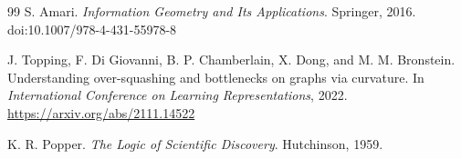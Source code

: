 \documentclass[11pt]{article}
\begin{document}
\begin{thebibliography}{99}
S. Amari.
\newblock \emph{Information Geometry and Its Applications}.
\newblock Springer, 2016.
\newblock doi:10.1007/978-4-431-55978-8

J. Topping, F. Di Giovanni, B. P. Chamberlain, X. Dong, and M. M. Bronstein.
\newblock Understanding over-squashing and bottlenecks on graphs via curvature.
\newblock In \emph{International Conference on Learning Representations}, 2022.
\newblock \url{https://arxiv.org/abs/2111.14522}


K. R. Popper.
\newblock \emph{The Logic of Scientific Discovery}.
\newblock Hutchinson, 1959.

\end{thebibliography}
\end{document}
